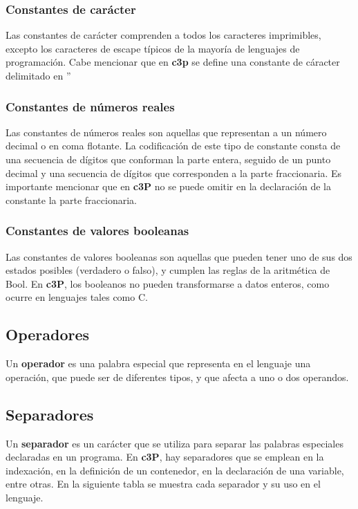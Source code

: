 \subsubsection{Constantes de carácter}

Las constantes de carácter comprenden a todos los caracteres imprimibles, excepto los
caracteres de escape típicos de la mayoría de lenguajes de programación. Cabe mencionar
que en \textbf{c3p} se define una constante de cáracter delimitado en ''

\subsubsection{Constantes de números reales}

Las constantes de números reales son aquellas que representan a un número decimal o
en coma flotante. La codificación de este tipo de constante consta de una secuencia
de dígitos que conforman la parte entera, seguido de un punto decimal y una secuencia
de dígitos que corresponden a la parte fraccionaria. Es importante mencionar que en
\textbf{c3P} no se puede omitir en la declaración de la constante la parte fraccionaria.

\subsubsection{Constantes de valores booleanas}

Las constantes de valores booleanas son aquellas que pueden tener uno de sus
dos estados posibles (verdadero o falso), y cumplen las reglas de la aritmética
de Bool. En \textbf{c3P}, los booleanos no pueden transformarse a datos enteros,
como ocurre en lenguajes tales como C.

\subsection{Operadores}

Un \textbf{operador} es una palabra especial que representa en el lenguaje una operación,
que puede ser de diferentes tipos, y que afecta a uno o dos operandos.

\subsection{Separadores}

Un \textbf{separador} es un carácter que se utiliza para separar las palabras especiales
declaradas en un programa. En \textbf{c3P}, hay separadores que se emplean en la indexación,
en la definición de un contenedor, en la declaración de una variable, entre otras. En la
siguiente tabla se muestra cada separador y su uso en el lenguaje.

